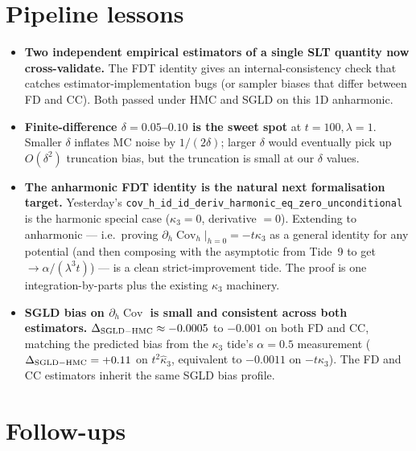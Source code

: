 \documentclass[11pt]{article}
\newcommand{\Cov}{\operatorname{Cov}}
\begin{document}
\section{Pipeline lessons}

\begin{itemize}[noitemsep,leftmargin=*]
\item \textbf{Two independent empirical estimators of a single SLT
  quantity now cross-validate.} The FDT identity gives an
  internal-consistency check that catches estimator-implementation
  bugs (or sampler biases that differ between FD and CC). Both passed
  under HMC and SGLD on this 1D anharmonic.

\item \textbf{Finite-difference $\delta = 0.05$--$0.10$ is the sweet
  spot} at $t = 100, \lambda = 1$. Smaller $\delta$ inflates MC noise
  by $1/(2\delta)$; larger $\delta$ would eventually pick up $O(\delta^2)$
  truncation bias, but the truncation is small at our $\delta$
  values.

\item \textbf{The anharmonic FDT identity is the natural next
  formalisation target.} Yesterday's
  \texttt{cov\_h\_id\_id\_deriv\_harmonic\_eq\_zero\_unconditional}
  is the harmonic special case ($\kappa_3 = 0$, derivative $= 0$).
  Extending to anharmonic — i.e.\ proving
  $\partial_h \Cov_h|_{h=0} = -t \kappa_3$ as a general identity for
  any potential (and then composing with the asymptotic from Tide~9
  to get $\to \alpha / (\lambda^3 t)$) — is a clean strict-improvement
  tide. The proof is one integration-by-parts plus the existing
  $\kappa_3$ machinery.

\item \textbf{SGLD bias on $\partial_h \Cov$ is small and consistent
  across both estimators.} $\Delta_{\rm SGLD-HMC} \approx -0.0005$ to
  $-0.001$ on both FD and CC, matching the predicted bias from the
  $\kappa_3$ tide's $\alpha = 0.5$ measurement ($\Delta_{\rm SGLD-HMC}
  = +0.11$ on $t^2 \hat\kappa_3$, equivalent to $-0.0011$ on
  $-t \hat\kappa_3$). The FD and CC estimators inherit the same SGLD
  bias profile.
\end{itemize}

\section{Follow-ups}
\end{document}
